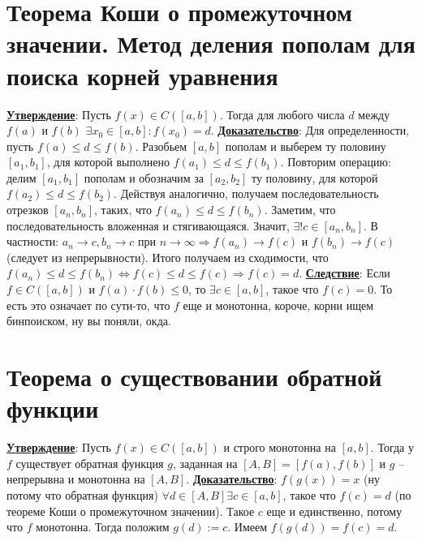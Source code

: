 \documentclass{article}
\DeclareMathOperator{\Exists}{\exists}
\DeclareMathOperator{\Forall}{\forall}
\begin{document}
\bigskip\bigskip
\section{Теорема Коши о промежуточном значении. Метод деления пополам для поиска корней уравнения}
\textbf{\underline{Утверждение}}: Пусть $f(x)\in C([a, b])$. Тогда для любого числа $d$ между $f(a)$ и $f(b)$ $\Exists x_0\in [a, b]\colon f(x_0) = d$.
\textbf{\underline{Доказательство}}: Для определенности, пусть $f(a) \leq d \leq f(b)$.\newline
Разобьем $[a, b]$ пополам и выберем ту половину $[a_1, b_1]$, для которой выполнено $f(a_1)\leq d\leq f(b_1)$.\newline
Повторим операцию: делим $[a_1, b_1]$ пополам и обозначим за $[a_2, b_2]$ ту половину, для которой $f(a_2) \leq d \leq f(b_2)$.\newline
Действуя аналогично, получаем последовательность отрезков $[a_n, b_n]$, таких, что $f(a_n) \leq d \leq f(b_n)$. Заметим, что последовательность вложенная и стягивающаяся. Значит, $\Exists ! c\in [a_n, b_n]$. В частности: $a_n\to c, b_n\to c$ при $n\to\infty \Rightarrow f(a_n)\to f(c)$ и $f(b_n)\to f(c)$ (следует из непрерывности). \newline
Итого получаем из сходимости, что $f(a_n) \leq d \leq f(b_n) \Leftrightarrow f(c) \leq d \leq f(c) \Rightarrow f(c) = d$.\newline
\textbf{\underline{Следствие}}: Если $f\in C([a, b])$ и $f(a)\cdot f(b) \leq 0$, то $\Exists c\in [a, b]$, такое что $f(c) = 0$. \newline
То есть это означает по сути-то, что $f$ еще и монотонна, короче, корни ищем бинпоиском, ну вы поняли, окда.
 
\bigskip\bigskip
\section{Теорема о существовании обратной функции}
\textbf{\underline{Утверждение}}: Пусть $f(x)\in C([a, b])$ и строго монотонна на $[a, b]$. Тогда у $f$ существует обратная функция $g$, заданная на $[A, B] = [f(a), f(b)]$ и $g$ -- непрерывна и монотонна на $[A, B]$.
\textbf{\underline{Доказательство}}: $f(g(x)) = x$ (ну потому что обратная функция)\newline
$\Forall d\in [A, B] \Exists c\in [a, b]$, такое что $f(c) = d$ (по теореме Коши о промежуточном значении). Такое $c$ еще и единственно, потому что $f$ монотонна.\newline
Тогда положим $g(d) := c$. Имеем $f(g(d)) = f(c) = d$.
 
\end{document}
